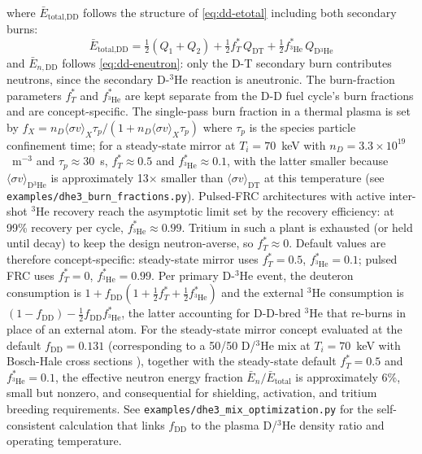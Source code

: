 \documentclass{article}
\begin{document}
\noindent where $\bar{E}_{\text{total,DD}}$ follows the structure
of \cref{eq:dd-etotal} including both secondary burns:
\begin{equation*}
\bar{E}_{\text{total,DD}} = \tfrac{1}{2}(Q_1 + Q_2)
  + \tfrac{1}{2} f_T^* \, Q_{\text{DT}}
  + \tfrac{1}{2} f_{{}^3\text{He}}^*
    \, Q_{\text{D}{}^3\text{He}}
\end{equation*}
and $\bar{E}_{n,\text{DD}}$ follows \cref{eq:dd-eneutron}: only the
D-T secondary burn contributes neutrons, since the secondary
D-${}^3$He reaction is aneutronic. The burn-fraction parameters
$f_T^*$ and $f_{{}^3\text{He}}^*$
are kept separate from the D-D fuel cycle's burn fractions and are
concept-specific. The single-pass burn fraction in a thermal plasma
is set by $f_X = n_D \langle\sigma v\rangle_X \tau_p / (1 + n_D
\langle\sigma v\rangle_X \tau_p)$ where $\tau_p$ is the species
particle confinement time; for a steady-state mirror at $T_i = 70$~keV
with $n_D = 3.3 \times 10^{19}$~m${}^{-3}$ and $\tau_p \approx 30$~s,
$f_T^* \approx 0.5$ and $f_{{}^3\text{He}}^* \approx 0.1$, with the latter
smaller because $\langle\sigma v\rangle_{\text{D}{}^3\text{He}}$ is
approximately 13$\times$ smaller than $\langle\sigma v\rangle_{\text{DT}}$ at this
temperature (see
\texttt{examples/dhe3\_burn\_fractions.py}). Pulsed-FRC architectures
with active inter-shot ${}^3$He recovery reach the
asymptotic limit set by the recovery efficiency: at 99\% recovery
per cycle, $f_{{}^3\text{He}}^* \approx 0.99$. Tritium in such a
plant is exhausted (or held until decay) to keep the design
neutron-averse, so $f_T^* \approx 0$. Default values are therefore
concept-specific: steady-state mirror uses $f_T^* = 0.5$,
$f_{{}^3\text{He}}^* = 0.1$; pulsed FRC uses $f_T^* = 0$,
$f_{{}^3\text{He}}^* = 0.99$.
Per primary D-${}^3$He event, the deuteron
consumption is $1 + f_{\text{DD}} (1 + \tfrac{1}{2} f_T^*
+ \tfrac{1}{2} f_{{}^3\text{He}}^*)$ and the
external ${}^3$He consumption is $(1 - f_{\text{DD}})
- \tfrac{1}{2} f_{\text{DD}} f_{{}^3\text{He}}^*$,
the latter accounting for D-D-bred ${}^3$He that re-burns in place
of an external atom.
For the steady-state mirror concept evaluated at the default
$f_{\text{DD}} = 0.131$ (corresponding to a 50/50 D/${}^3$He mix at
$T_i = 70$~keV with Bosch-Hale cross sections \citep{boschhale1992}),
together with the steady-state default $f_T^* = 0.5$ and
$f_{{}^3\text{He}}^* = 0.1$, the effective neutron energy fraction
$\bar{E}_n / \bar{E}_{\text{total}}$ is approximately 6\%, small but
nonzero, and consequential for shielding, activation, and tritium
breeding requirements. See \texttt{examples/dhe3\_mix\_optimization.py}
for the self-consistent calculation that links $f_{\text{DD}}$ to the
plasma D/${}^3$He density ratio and operating temperature.
\end{document}
